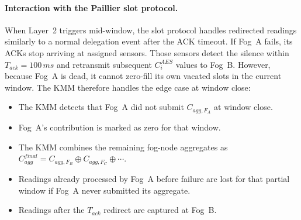 \documentclass[conference]{IEEEtran}
\begin{document}
    \begin{table}[htbp]
    \caption{Three-Layer Fault Handling Hierarchy}
    \label{table:fault-hierarchy}
    \centering
    \end{table}

    \paragraph{Interaction with the Paillier slot protocol.}
    When Layer~2 triggers mid-window, the slot protocol handles redirected readings similarly to a normal delegation event after the ACK timeout. If Fog~A fails, its ACKs stop arriving at assigned sensors. Those sensors detect the silence within $T_{ack}=100\,ms$ and retransmit subsequent $C_i^{AES}$ values to Fog~B. However, because Fog~A is dead, it cannot zero-fill its own vacated slots in the current window. The KMM therefore handles the edge case at window close:

    \begin{itemize}
        \item The KMM detects that Fog~A did not submit $C_{agg,F_A}$ at window close.
        \item Fog~A's contribution is marked as zero for that window.
        \item The KMM combines the remaining fog-node aggregates as $C_{agg}^{final}=C_{agg,F_B}\oplus C_{agg,F_C}\oplus\cdots$.
        \item Readings already processed by Fog~A before failure are lost for that partial window if Fog~A never submitted its aggregate.
        \item Readings after the $T_{ack}$ redirect are captured at Fog~B.
    \end{itemize}
\end{document}
